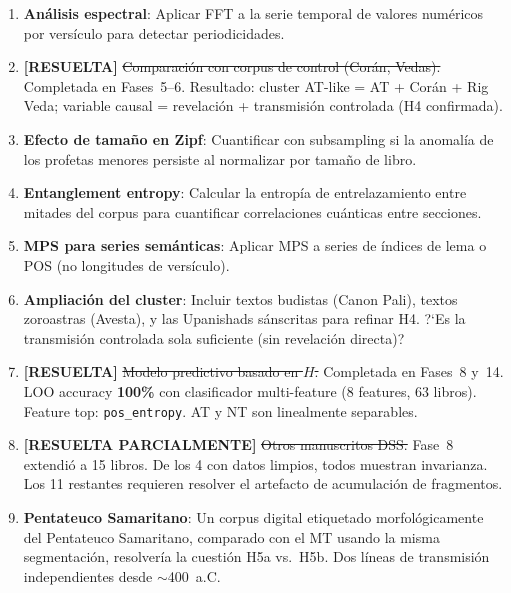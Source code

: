 \documentclass[12pt,a4paper]{article}
\begin{document}
\begin{enumerate}[leftmargin=2em]

\item \textbf{An\'alisis espectral}: Aplicar FFT a la serie temporal de valores
      num\'ericos por vers\'iculo para detectar periodicidades.

\item \textbf{[RESUELTA]} \sout{Comparaci\'on con corpus de control (Cor\'an, Vedas).}
      Completada en Fases~5--6. Resultado: cluster AT-like = AT + Cor\'an + Rig Veda;
      variable causal = revelaci\'on + transmisi\'on controlada (H4 confirmada).

\item \textbf{Efecto de tama\~no en Zipf}: Cuantificar con subsampling si la anomal\'ia
      de los profetas menores persiste al normalizar por tama\~no de libro.

\item \textbf{Entanglement entropy}: Calcular la entrop\'ia de entrelazamiento entre
      mitades del corpus para cuantificar correlaciones cu\'anticas entre secciones.

\item \textbf{MPS para series sem\'anticas}: Aplicar MPS a series de
      \'indices de lema o POS (no longitudes de vers\'iculo).

\item \textbf{Ampliaci\'on del cluster}: Incluir textos budistas (Canon Pali),
      textos zoroastras (Avesta), y las Upanishads s\'anscritas para refinar H4.
      ?`Es la transmisi\'on controlada sola suficiente (sin revelaci\'on directa)?

\item \textbf{[RESUELTA]} \sout{Modelo predictivo basado en $H$.}
      Completada en Fases~8 y~14. LOO accuracy \textbf{100\%} con clasificador
      multi-feature (8 features, 63 libros). Feature top: \texttt{pos\_entropy}.
      AT y NT son linealmente separables.

\item \textbf{[RESUELTA PARCIALMENTE]} \sout{Otros manuscritos DSS.}
      Fase~8 extendi\'o a 15 libros. De los 4 con datos limpios, todos muestran
      invarianza. Los 11 restantes requieren resolver el artefacto de acumulaci\'on
      de fragmentos.

\item \textbf{Pentateuco Samaritano}: Un corpus digital etiquetado morfol\'ogicamente
      del Pentateuco Samaritano, comparado con el MT usando la misma segmentaci\'on,
      resolver\'ia la cuesti\'on H5a vs.\ H5b. Dos l\'ineas de transmisi\'on independientes
      desde $\sim$400~a.C.


\end{enumerate}
\end{document}
